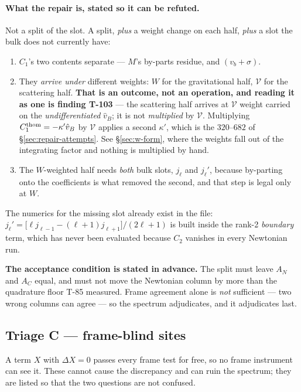 \paragraph{What the repair is, stated so it can be refuted.}
Not a split of the slot. A split, \emph{plus} a weight change on each half,
\emph{plus} a slot the bulk does not currently have:
\begin{enumerate}\itemsep2pt
  \item $C_1$'s two contents separate --- $M$'s by-parts residue, and
        $(v_b+\sigma)$.
  \item They \emph{arrive under} different weights: $W$ for the gravitational
        half, $\mathcal V$ for the scattering half. \textbf{That is an
        outcome, not an operation, and reading it as one is finding
        \textbf{T-103}} --- the scattering half arrives at $\mathcal V$ weight
        carried on the \emph{undifferentiated} $\hat v_B$; it is not
        \emph{multiplied} by $\mathcal V$. Multiplying
        $C_1^{\rm thom}=-\kappa'\hat v_B$ by $\mathcal V$ applies a second
        $\kappa'$, which is the $320$--$682$ of
        \S\ref{sec:repair-attempts}. See \S\ref{sec:w-form}, where the
        weights fall out of the integrating factor and nothing is multiplied
        by hand.
  \item The $W$-weighted half needs \emph{both} bulk slots, $j_\ell$ and
        $j_\ell'$, because by-parting onto the coefficients is what removed the
        second, and that step is legal only at $W$.
\end{enumerate}
The numerics for the missing slot already exist in the file:
$j_\ell' = \bigl[\ell j_{\ell-1}-(\ell+1)j_{\ell+1}\bigr]/(2\ell+1)$ is built
inside the rank-2 \emph{boundary} term, which has never been evaluated because
$C_2$ vanishes in every Newtonian run.

\textbf{The acceptance condition is stated in advance.} The split must leave
$A_N$ and $A_C$ equal, and must not move the Newtonian column by more than the
quadrature floor T-85 measured. Frame agreement alone is \emph{not}
sufficient --- two wrong columns can agree --- so the spectrum adjudicates, and
it adjudicates last.

\subsection{Triage C --- frame-blind sites}
A term $X$ with $\Delta X=0$ passes every frame test for free, so no frame
instrument can see it. These cannot cause the discrepancy and can ruin the
spectrum; they are listed so that the two questions are not confused.

